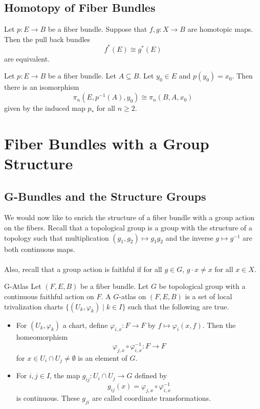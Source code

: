 \documentclass[a4paper]{article}
\begin{document}
\subsection{Homotopy of Fiber Bundles}
\begin{thm}{}{} Let $p:E\to B$ be a fiber bundle. Suppose that $f,g:X\to B$ are homotopic maps. Then the pull back bundles $$f^\ast(E)\cong g^\ast(E)$$ are equivalent. 
\end{thm}

\begin{thm}{}{} Let $p:E\to B$ be a fiber bundle. Let $A\subseteq B$. Let $y_0\in E$ and $p(y_0)=x_0$. Then there is an isomorphism $$\pi_n(E,p^{-1}(A),y_0)\cong\pi_n(B,A,x_0)$$ given by the induced map $p_\ast$ for all $n\geq 2$. 
\end{thm}

\pagebreak
\section{Fiber Bundles with a Group Structure}
\subsection{G-Bundles and the Structure Groups}
We would now like to enrich the structure of a fiber bundle with a group action on the fibers. Recall that a topological group is a group with the structure of a topology such that multiplication $(g_1,g_2)\mapsto g_1g_2$ and the inverse $g\mapsto g^{-1}$ are both continuous maps. \\~\\

Also, recall that a group action is faithful if for all $g\in G$, $g\cdot x\neq x$ for all $x\in X$. 

\begin{defn}{G-Atlas}{} Let $(F,E,B)$ be a fiber bundle. Let $G$ be topological group with a continuous faithful action on $F$. A $G$-atlas on $(F,E,B)$ is a set of local trivalization charts $\{(U_k,\varphi_k)\;|\;k\in I\}$ such that the following are true. 
\begin{itemize}
\item For $(U_k,\varphi_k)$ a chart, define $\varphi_{i,x}:F\to F$ by $f\mapsto\varphi_i(x,f)$. Then the homeomorphism $$\varphi_{j,x}\circ\varphi_{i,x}^{-1}:F\to F$$ for $x\in U_i\cap U_j\neq\emptyset$ is an element of $G$. 
\item For $i,j\in I$, the map $g_{ij}:U_i\cap U_j\to G$ defined by $$g_{ij}(x)=\varphi_{j,x}\circ\varphi_{i,x}^{-1}$$ is continuous. These $g_{ji}$ are called coordinate transformations. 
\end{itemize}
\end{defn}
\end{document}
